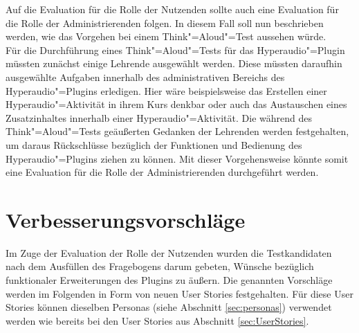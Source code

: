 Auf die Evaluation für die Rolle der Nutzenden sollte auch eine Evaluation für die Rolle der Administrierenden folgen. In diesem Fall soll nun beschrieben werden, wie das Vorgehen bei einem Think"=Aloud"=Test aussehen würde.\\
Für die Durchführung eines Think"=Aloud"=Tests für das Hyperaudio"=Plugin müssten zunächst einige Lehrende ausgewählt werden. Diese müssten daraufhin ausgewählte Aufgaben innerhalb des administrativen Bereichs des Hyperaudio"=Plugins erledigen. Hier wäre beispielsweise das Erstellen einer Hyperaudio"=Aktivität in ihrem Kurs denkbar oder auch das Austauschen eines Zusatzinhaltes innerhalb einer Hyperaudio"=Aktivität. Die während des Think"=Aloud"=Tests geäußerten Gedanken der Lehrenden werden festgehalten, um daraus Rückschlüsse bezüglich der Funktionen und Bedienung des Hyperaudio"=Plugins ziehen zu können. Mit dieser Vorgehensweise könnte somit eine Evaluation für die Rolle der Administrierenden durchgeführt werden.






\section{Verbesserungsvorschläge}
\label{sec:Verbesserungsvorschlaege}
Im Zuge der Evaluation der Rolle der Nutzenden wurden die Testkandidaten nach dem Ausfüllen des Fragebogens darum gebeten, Wünsche bezüglich funktionaler Erweiterungen des Plugins zu äußern. Die genannten Vorschläge werden im Folgenden in Form von neuen User Stories festgehalten. Für diese User Stories können dieselben Personas (siehe Abschnitt \ref{sec:personas}) verwendet werden wie bereits bei den User Stories aus Abschnitt \ref{sec:UserStories}.


